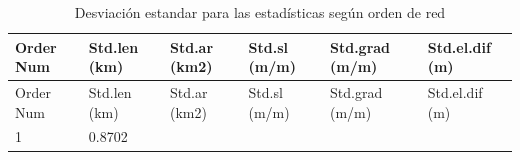 \documentclass[11pt,]{article}
\begin{document}
\begin{longtable}[]{@{}llllll@{}}
\caption{\label{tablacinco}Desviación estandar para las estadísticas
según orden de red}\tabularnewline
\toprule
\begin{minipage}[b]{0.13\columnwidth}\raggedright\strut
Order Num\strut
\end{minipage} & \begin{minipage}[b]{0.13\columnwidth}\raggedright\strut
Std.len (km)\strut
\end{minipage} & \begin{minipage}[b]{0.13\columnwidth}\raggedright\strut
Std.ar (km2)\strut
\end{minipage} & \begin{minipage}[b]{0.13\columnwidth}\raggedright\strut
Std.sl (m/m)\strut
\end{minipage} & \begin{minipage}[b]{0.15\columnwidth}\raggedright\strut
Std.grad (m/m)\strut
\end{minipage} & \begin{minipage}[b]{0.15\columnwidth}\raggedright\strut
Std.el.dif (m)\strut
\end{minipage}\tabularnewline
\midrule
\endfirsthead
\toprule
\begin{minipage}[b]{0.13\columnwidth}\raggedright\strut
Order Num\strut
\end{minipage} & \begin{minipage}[b]{0.13\columnwidth}\raggedright\strut
Std.len (km)\strut
\end{minipage} & \begin{minipage}[b]{0.13\columnwidth}\raggedright\strut
Std.ar (km2)\strut
\end{minipage} & \begin{minipage}[b]{0.13\columnwidth}\raggedright\strut
Std.sl (m/m)\strut
\end{minipage} & \begin{minipage}[b]{0.15\columnwidth}\raggedright\strut
Std.grad (m/m)\strut
\end{minipage} & \begin{minipage}[b]{0.15\columnwidth}\raggedright\strut
Std.el.dif (m)\strut
\end{minipage}\tabularnewline
\midrule
\endhead
\begin{minipage}[t]{0.13\columnwidth}\raggedright\strut
1\strut
\end{minipage} & \begin{minipage}[t]{0.13\columnwidth}\raggedright\strut
0.8702\strut
\end{minipage} & \begin{minipage}[t]{0.13\columnwidth}\raggedright\strut

\end{minipage}
\end{longtable}
\end{document}
